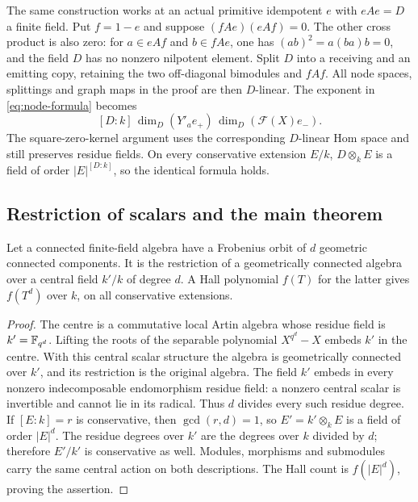 The same construction works at an actual primitive idempotent $e$ with $eAe=D$ a finite field. Put $f=1-e$ and suppose $(fAe)(eAf)=0$. The other cross product is also zero: for $a\in eAf$ and $b\in fAe$, one has $(ab)^2=a(ba)b=0$, and the field $D$ has no nonzero nilpotent element. Split $D$ into a receiving and an emitting copy, retaining the two off-diagonal bimodules and $fAf$. All node spaces, splittings and graph maps in the proof are then $D$-linear. The exponent in \eqref{eq:node-formula} becomes
\begin{equation}\label{eq:node-degree}
 [D:k]\,\dim_D(Y'_ae_+)\,\dim_D(\mathcal F(X)e_-).
\end{equation}
The square-zero-kernel argument uses the corresponding $D$-linear Hom space and still preserves residue fields. On every conservative extension $E/k$, $D\otimes_kE$ is a field of order $|E|^{[D:k]}$, so the identical formula holds.

\subsection{Restriction of scalars and the main theorem}
\begin{lemma}\label{lem:central-field}
Let a connected finite-field algebra have a Frobenius orbit of $d$ geometric connected components. It is the restriction of a geometrically connected algebra over a central field $k'/k$ of degree $d$. A Hall polynomial $f(T)$ for the latter gives $f(T^d)$ over $k$, on all conservative extensions.
\end{lemma}
\begin{proof}
The centre is a commutative local Artin algebra whose residue field is $k'=\mathbb F_{q^d}$. Lifting the roots of the separable polynomial $X^{q^d}-X$ embeds $k'$ in the centre. With this central scalar structure the algebra is geometrically connected over $k'$, and its restriction is the original algebra. The field $k'$ embeds in every nonzero indecomposable endomorphism residue field: a nonzero central scalar is invertible and cannot lie in its radical. Thus $d$ divides every such residue degree. If $[E:k]=r$ is conservative, then $\gcd(r,d)=1$, so $E'=k'\otimes_kE$ is a field of order $|E|^d$. The residue degrees over $k'$ are the degrees over $k$ divided by $d$; therefore $E'/k'$ is conservative as well. Modules, morphisms and submodules carry the same central action on both descriptions. The Hall count is $f(|E|^d)$, proving the assertion.
\end{proof}

